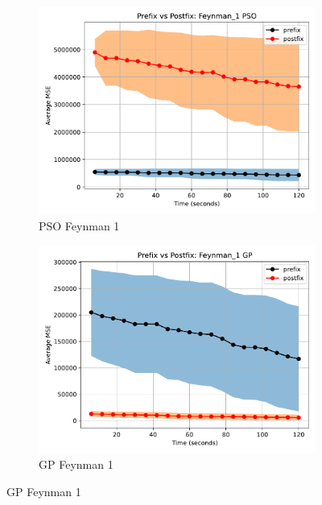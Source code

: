 \documentclass[runningheads]{llncs}
\begin{document}
\begin{figure}
    \vspace{0.5cm}
    
    \begin{subfigure}[b]{0.4\textwidth}
        \includegraphics[width=\linewidth, keepaspectratio]{AIFeynman_Benchmarks/PrePostFeynman_1PSO.pdf}
        \caption{PSO Feynman 1}
        \label{subfig:feynman_1_PSO}
    \end{subfigure}
    \begin{subfigure}[b]{0.4\textwidth}
        \includegraphics[width=\linewidth, keepaspectratio]{AIFeynman_Benchmarks/PrePostFeynman_1GP.pdf}
        \caption{GP Feynman 1}
        \label{subfig:feynman_1_GP}
    \end{subfigure}
    

\end{figure}
\end{document}

